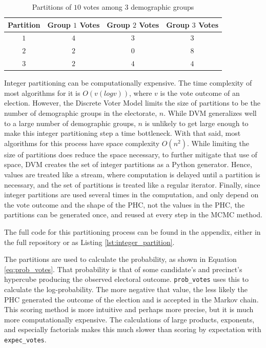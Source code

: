 \begin{table}[!h]
 \centering
 \caption{Partitions of $10$ votes among $3$ demographic groups}
 \label{table:partitions}
 \begin{tabular}{|c|c|c|c|}
   \hline
    Partition & Group $1$ Votes & Group $2$ Votes & Group $3$ Votes \\\hline
    $1$ & $4$ & $3$ & $3$  \\
    $2$ & $2$ & $0$ & $8$  \\
    $3$ & $2$ & $4$ & $4$  \\
    \hline
 \end{tabular}
\end{table}

Integer partitioning can be computationally expensive. The time complexity of most algorithms for it is $O(v (log v))$, where $v$ is the vote outcome of an election. However, the Discrete Voter Model limits the size of partitions to be the number of demographic groups in the electorate, $n$. While DVM generalizes well to a large number of demographic groups, $n$ is unlikely to get large enough to make this integer partitioning step a time bottleneck. With that said, most algorithms for this process have space complexity $O(n^2)$. While limiting the size of partitions does reduce the space necessary, to further mitigate that use of space, DVM creates the set of integer partitions as a Python generator. Hence, values are treated like a stream, where computation is delayed until a partition is necessary, and the set of partitions is treated like a regular iterator. Finally, since integer partitions are used several times in the computation, and only depend on the vote outcome and the shape of the PHC, not the values in the PHC, the partitions can be generated once, and reused at every step in the MCMC method.

The full code for this partitioning process can be found in the appendix, either in the full repository or as Listing \ref{lst:integer_partition}.

The partitions are used to calculate the probability, as shown in Equation \ref{eq:prob_votes}. That probability is that of some candidate's and precinct's hypercube producing the observed electoral outcome. \texttt{prob\_votes} uses this to calculate the log-probability. The more negative that value, the less likely the PHC generated the outcome of the election and is accepted in the Markov chain. This scoring method is more intuitive and perhaps more precise, but it is much more computationally expensive. The calculations of large products, exponents, and especially factorials makes this much slower than scoring by expectation with \texttt{expec\_votes}.

